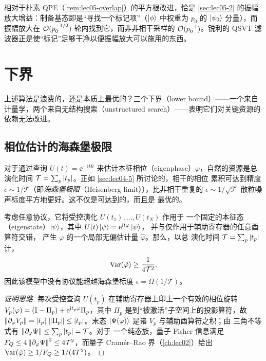 \begin{remark}[为何是 $p_0^{-1/2}$ 而非 $p_0^{-1}$]
\label{rem:lec05-sqrt}
相对于朴素 QPE（\cref{rem:lec05-overlap}）的平方根改进，恰是 \cref{sec:lec05-2} 的振幅放大增益：制备基态即是``寻找一个标记项''（$\ket{\phi}$ 中权重为 $p_0$ 的 $\ket{\psi_0}$ 分量），而振幅放大在 $\mathcal{O}(p_0^{-1/2})$ 轮内找到它，而非非相干采样的 $\mathcal{O}(p_0^{-1})$。锐利的 QSVT 滤波器正是使``标记''足够干净以便振幅放大可以施用的东西。
\end{remark}
\section{下界}
\label{sec:lec05-4}

上述算法是浪费的，还是本质上最优的？三个下界（lower bound）——一个来自计量学，两个来自无结构搜索（unstructured search）——表明它们对关键资源的依赖无法改进。

\subsection*{相位估计的海森堡极限}

对于通过查询 $U(t)=\ee^{-\ii Ht}$ 来估计本征相位（eigenphase）$\varphi$，自然的资源是总演化时间
$\mathcal T=\sum_p\left\lvert t_p \right\rvert$。正如 \cref{sec:lec04-5} 所讨论的，相干的相位
累积可达到精度 $\epsilon\sim1/\mathcal T$（即\emph{海森堡极限}（Heisenberg
limit）），比非相干重复的 $\epsilon\sim1/\sqrt{\mathcal T}$
散粒噪声标度平方地更好。这不仅是可达到的，而且是
最优的。

\begin{theorem}[海森堡极限下界]
\label{thm:lec05-hl}
考虑任意协议，它将受控演化 $U(t_1),\dots,U(t_N)$ 作用于
一个固定的本征态（eigenstate）$\ket{\psi}$，其中 $U(t)\ket{\psi}=\mathrm{e}^{\mathrm{i} t\varphi}\ket{\psi}$，
并与仅作用于辅助寄存器的任意酉算符交错，
产生 $\varphi$ 的一个局部无偏估计量 $\hat\varphi$。那么，以总
演化时间 $\mathcal T=\sum_p\left\lvert t_p \right\rvert$ 计，
\[
  \operatorname{Var}(\hat\varphi)\ge\frac{1}{4\mathcal T^{2}}.
\]
因此该模型中没有协议能超越海森堡标度
$\epsilon=\Omega(1/\mathcal T)$。
\end{theorem}

\begin{proof}[证明思路]
每次受控查询 $U(t_p)$ 在辅助寄存器上印上一个有效的相位旋转
$V_p(\varphi)=(\mathbb{I}-\Pi_p)+\mathrm{e}^{\mathrm{i} t_p\varphi}\Pi_p$，其中 $\Pi_p$
是到“被激活”子空间上的投影算符，故
$\left\lVert \partial_\varphi V_p \right\rVert=\left\lvert t_p \right\rvert\,\left\lVert \Pi_p \right\rVert\le\left\lvert t_p \right\rvert$。末态
$\ket{\Psi(\varphi)}$ 是诸 $V_p$ 与辅助酉算符之积；由
三角不等式有 $\left\lVert \partial_\varphi\Psi \right\rVert\le\sum_p\left\lvert t_p \right\rvert=\mathcal T$。对于
一个纯态族，量子 Fisher 信息满足
$F_Q\le4\left\lVert \partial_\varphi\Psi \right\rVert^2\le4\mathcal T^2$，而量子
Cram\'er--Rao 界（\cref{ch:lec02}）给出
$\operatorname{Var}(\hat\varphi)\ge1/F_Q\ge1/(4\mathcal T^2)$。
\end{proof}

